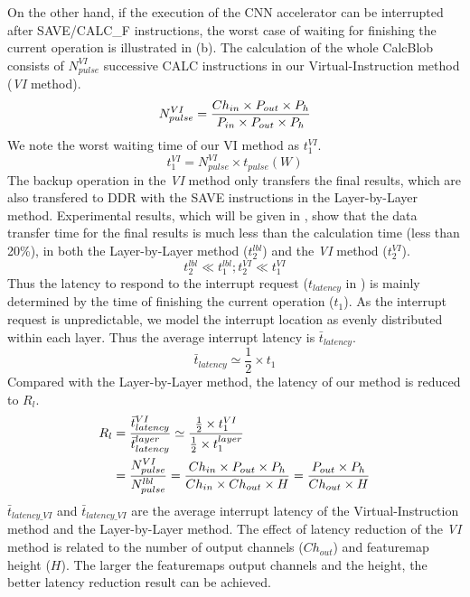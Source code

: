 On the other hand, if the execution of the CNN accelerator can be interrupted after SAVE/CALC\_F instructions, the worst case of waiting for finishing the current operation is illustrated in (b). 
The calculation of the whole CalcBlob consists of $N_{pulse}^{VI}$ successive CALC instructions in our Virtual-Instruction method (\textit{VI} method).
\begin{equation}
	\small
	N_{pulse}^{VI} = \frac{ Ch_{in} \times P_{out} \times P_{h} }{ P_{in} \times P_{out} \times P_{h} } 
\end{equation}
We note the worst waiting time of our VI method as $t_{1}^{VI}$.
\begin{equation}
t_{1}^{VI} = N_{pulse}^{VI} \times t_{pulse}(W)
\end{equation}
The backup operation in the \textit{VI} method only transfers the final results, which are also transfered to DDR with the SAVE instructions in the Layer-by-Layer method. 
Experimental results, which will be given in , show that the data transfer time for the final results is much less than the calculation time (less than 20\%), in both the Layer-by-Layer method ($t_{2}^{lbl}$) and the \textit{VI} method ($t_{2}^{VI}$). 
\begin{equation}
	t_{2}^{lbl} \ll t_{1}^{lbl} ; 
	t_{2}^{VI} \ll t_{1}^{VI}
\end{equation}
Thus the latency to respond to the interrupt request ($t_{latency}$ in ) is mainly determined by the time of finishing the current operation ($t_1$).
As the interrupt request is unpredictable, we model the interrupt location as evenly distributed within each layer. Thus the average interrupt latency is $\bar{t}_{latency} $.
\begin{equation}
	\bar{t}_{latency} \simeq \frac{1}{2} \times t_{1}
\end{equation}
Compared with the Layer-by-Layer method, the latency of our method is reduced to $R_l$.
\begin{equation}
	\small
	\begin{split}
	R_l & = \frac{\bar{t}_{latency}^{VI}}{\bar{t}_{latency}^{layer}} \simeq \frac{\frac{1}{2} \times t_{1}^{VI}}{\frac{1}{2} \times t_{1}^{layer}} \\
		 & = \frac{ N_{pulse}^{VI} }{N_{pulse}^{lbl} } = \frac{ Ch_{in} \times P_{out} \times P_{h} }{ Ch_{in} \times Ch_{out} \times H } = \frac{ P_{out} \times P_{h} }{ Ch_{out} \times H} 
	\end{split}
	\label{equ:latencyRL}
\end{equation}
$\bar{t}_{latency\_VI}$ and $\bar{t}_{latency\_VI}$ are the average interrupt latency of the Virtual-Instruction method and the Layer-by-Layer method. The effect of latency reduction of the \textit{VI} method is related to the number of output channels ($Ch_{out}$) and featuremap height ($H$). The larger the featuremaps output channels and the height, the better latency reduction result can be achieved.

